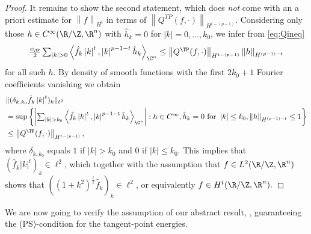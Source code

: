 \begin{proof}
   It remains to show the second statement, which does \emph{not} come with an a priori estimate for $ \left\|f \right\|_{H^{t}} $ in terms of $ \left\|Q^{TP}(f,\cdot) \right\|_{H^{t-(p-1)}} $. Considering only those $ h\in C^\infty(\R/\Z,\R^n) $ with $ \hat{h}_{k}=0 $ for $ \left|k \right|=0,\dots,k_0 $, we infer from \cref{eq:Qineq} 
   \begin{align*}\textstyle
    \frac{c_{\TP}}{2}\sum_{\left|k \right|>0}\left\langle \hat{f}_{k}\left|k \right|^t,\left|k \right|^{p-1-t}\hat{h}_{k} \right\rangle_{\C^n} \le \left\|Q^{\TP}(f,\cdot) \right\|_{H^{t-(p-1)}}\left\|h \right\|_{H^{(p-1)-t}}
   \end{align*}
   for all such $ h $. By density of smooth functions with the first $ 2k_{0}+1 $ Fourier coefficients vanishing we obtain
   \begin{align*}\textstyle
    &\|( \delta_{k,k_0}\hat{f}_{k}\left|k \right|^t )_{k}\|_{\ell^2}\\
    &\textstyle=\sup\left\{\left|\sum_{\left|k \right|>k_0}\left\langle \hat{f}_{k}\left|k \right|^t,\left|k \right|^{p-1-t}\hat{h}_{k} \right\rangle_{\C^n}  \right|: h\in C^\infty,\hat{h}_{k}=0\text{ for } \left|k \right|\le k_0,\left\|h \right\|_{H^{(p-1)-t}}\le 1\right\}\\
    &\le \left\|Q^{\TP}(f,\cdot) \right\|_{H^{t-(p-1)}},
   \end{align*}
   where $ \delta_{k,k_0}$  equals $1 $ if $ \left|k \right|>k_0 $ and $ 0 $ if $ \left|k \right|\le k_0 $. This implies that $ (\hat{f}_{k}\left|k \right|^{t})_{k}\in \ell^2 $, which together with the assumption that $ f\in L^2(\R/\Z,\R^n) $ shows that $ ((1+k^2)^{\frac{t}{2}}\hat{f}_{k})_{k}\in \ell^2 $, or equivalently $ f\in H^{t}(\R/\Z,\R^n).$
\end{proof}

We are now going to verify the assumption of our
abstract result, ,
guaranteeing the (PS)-condition for the tangent-point energies.

